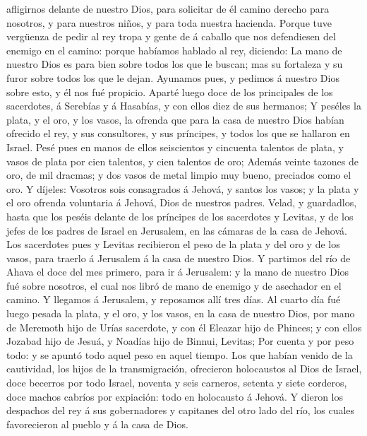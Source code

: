 afligirnos delante de nuestro Dios, para solicitar de él camino derecho
para nosotros, y para nuestros niños, y para toda nuestra hacienda.
 Porque tuve vergüenza de pedir al rey tropa y gente de á
caballo que nos defendiesen del enemigo en el camino: porque habíamos
hablado al rey, diciendo: La mano de nuestro Dios es para bien sobre
todos los que le buscan; mas su fortaleza y su furor sobre todos los que
le dejan.  Ayunamos pues, y pedimos á nuestro Dios sobre
esto, y él nos fué propicio.  Aparté luego doce de los
principales de los sacerdotes, á Serebías y á Hasabías, y con ellos diez
de sus hermanos;  Y peséles la plata, y el oro, y los
vasos, la ofrenda que para la casa de nuestro Dios habían ofrecido el
rey, y sus consultores, y sus príncipes, y todos los que se hallaron en
Israel.  Pesé pues en manos de ellos seiscientos y
cincuenta talentos de plata, y vasos de plata por cien talentos, y cien
talentos de oro;  Además veinte tazones de oro, de mil
dracmas; y dos vasos de metal limpio muy bueno, preciados como el oro.
 Y díjeles: Vosotros sois consagrados á Jehová, y santos
los vasos; y la plata y el oro ofrenda voluntaria á Jehová, Dios de
nuestros padres.  Velad, y guardadlos, hasta que los peséis
delante de los príncipes de los sacerdotes y Levitas, y de los jefes de
los padres de Israel en Jerusalem, en las cámaras de la casa de Jehová.
 Los sacerdotes pues y Levitas recibieron el peso de la
plata y del oro y de los vasos, para traerlo á Jerusalem á la casa de
nuestro Dios.  Y partimos del río de Ahava el doce del mes
primero, para ir á Jerusalem: y la mano de nuestro Dios fué sobre
nosotros, el cual nos libró de mano de enemigo y de asechador en el
camino.  Y llegamos á Jerusalem, y reposamos allí tres
días.  Al cuarto día fué luego pesada la plata, y el oro, y
los vasos, en la casa de nuestro Dios, por mano de Meremoth hijo de
Urías sacerdote, y con él Eleazar hijo de Phinees; y con ellos Jozabad
hijo de Jesuá, y Noadías hijo de Binnui, Levitas;  Por
cuenta y por peso todo: y se apuntó todo aquel peso en aquel tiempo.
 Los que habían venido de la cautividad, los hijos de la
transmigración, ofrecieron holocaustos al Dios de Israel, doce becerros
por todo Israel, noventa y seis carneros, setenta y siete corderos, doce
machos cabríos por expiación: todo en holocausto á Jehová. 
Y dieron los despachos del rey á sus gobernadores y capitanes del otro
lado del río, los cuales favorecieron al pueblo y á la casa de Dios.

